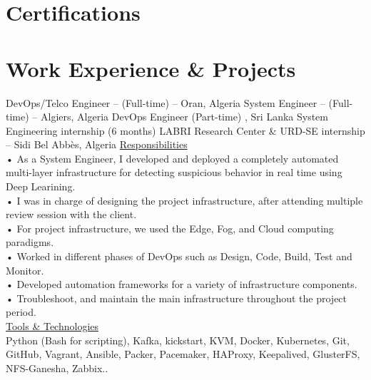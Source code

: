 \documentclass{cv}
\begin{document}
\section{Certifications}


\section{Work Experience \& Projects}
{DevOps/Telco Engineer -- (Full-time)}
{\lab -- Oran, Algeria\vspace{.3cm}}
{}
{System Engineer -- (Full-time)}
{\umtk -- Algiers, Algeria\vspace{.3cm}}
{}
{DevOps Engineer (Part-time)}
{\keeneye, Sri Lanka}
{}
    {System Engineering internship (6 months)
    }
    {LABRI Research Center  \& URD-SE internship -- Sidi Bel Abbès, Algeria\vspace{.3cm}}
    {
      \underline {Responsibilities}\vspace{.3cm}\\
      • As a System Engineer, I developed and deployed a completely automated multi-layer infrastructure 
      for detecting suspicious behavior in real time using Deep Learining.\\
      • I was in charge of designing the project infrastructure, after attending multiple review session 
      with the client.\\
      • For project infrastructure, we used the Edge, Fog, and Cloud computing paradigms.\\
      • Worked in different phases of DevOps such as Design, Code, Build, Test and Monitor.\\
      • Developed automation frameworks for a variety of infrastructure components.\\
      • Troubleshoot, and maintain the main infrastructure throughout the project period.\\
      \underline {Tools \& Technologies}\\
      Python (Bash for scripting), Kafka, kickstart, KVM, Docker, Kubernetes, Git, GitHub, Vagrant, Ansible, Packer, Pacemaker, HAProxy, Keepalived, GlusterFS, NFS-Ganesha, Zabbix..\\
    }
\end{document}
